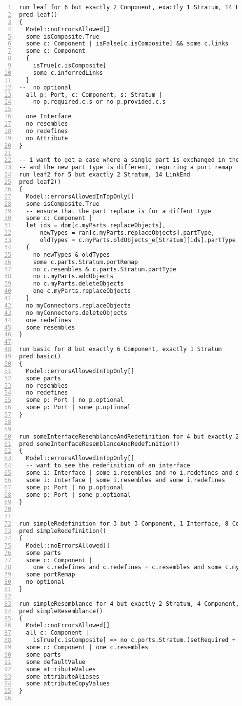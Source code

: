 \begin{lstlisting}[caption={unittests\_redefinition.als}, numbers=left]
run leaf for 6 but exactly 2 Component, exactly 1 Stratum, 14 LinkEnd, 8 ConnectorEnd
pred leaf()
{
  Model::noErrorsAllowed[]
  some isComposite.True
  some c: Component | isFalse[c.isComposite] && some c.links
  some c: Component
  {
    isTrue[c.isComposite]
    some c.inferredLinks
  }
--  no optional
  all p: Port, c: Component, s: Stratum |
    no p.required.c.s or no p.provided.c.s
    
  one Interface
  no resembles
  no redefines
  no Attribute
}

-- i want to get a case where a single part is exchanged in the resembling component
-- and the new part type is different, requiring a port remap
run leaf2 for 5 but exactly 2 Stratum, 14 LinkEnd
pred leaf2()
{
  Model::errorsAllowedInTopOnly[]
  some isComposite.True
  -- ensure that the part replace is for a diffent type
  some c: Component |
  let ids = dom[c.myParts.replaceObjects],
      newTypes = ran[c.myParts.replaceObjects].partType,
      oldTypes = c.myParts.oldObjects_e[Stratum][ids].partType
  {
    no newTypes & oldTypes
    some c.parts.Stratum.portRemap
    no c.resembles & c.parts.Stratum.partType
    no c.myParts.addObjects
    no c.myParts.deleteObjects
    one c.myParts.replaceObjects
  }
  no myConnectors.replaceObjects
  no myConnectors.deleteObjects
  one redefines
  some resembles
}

run basic for 8 but exactly 6 Component, exactly 1 Stratum
pred basic()
{
  Model::errorsAllowedInTopOnly[]
  some parts
  no resembles
  no redefines
  some p: Port | no p.optional
  some p: Port | some p.optional
}

  
run someInterfaceResemblanceAndRedefinition for 4 but exactly 2 Stratum, 3 Interface, 8 ConnectorEnd
pred someInterfaceResemblanceAndRedefinition()
{
  Model::errorsAllowedInTopOnly[]
  -- want to see the redefinition of an interface
  some i: Interface | some i.resembles and no i.redefines and some i.superTypes
  some i: Interface | some i.resembles and some i.redefines
  some p: Port | no p.optional
  some p: Port | some p.optional
}


run simpleRedefinition for 3 but 3 Component, 1 Interface, 8 ConnectorEnd, 12 LinkEnd
pred simpleRedefinition()
{
  Model::noErrorsAllowed[]
  some parts
  some c: Component |
    one c.redefines and c.redefines = c.resembles and some c.myParts.replaceObjects
  some portRemap
  no optional
}

run simpleResemblance for 4 but exactly 2 Stratum, 4 Component, exactly 2 Interface, 8 ConnectorEnd, 8 LinkEnd
pred simpleResemblance()
{
  Model::noErrorsAllowed[]
  all c: Component |
    isTrue[c.isComposite] => no c.ports.Stratum.(setRequired + setProvided)
  some c: Component | one c.resembles
  some parts
  some defaultValue
  some attributeValues
  some attributeAliases
  some attributeCopyValues
}


\end{lstlisting}
